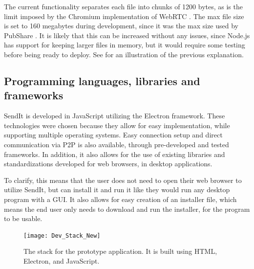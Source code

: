     The current functionality separates each file into chunks of 1200 bytes, as is the limit imposed by the Chromium implementation of WebRTC \cite{SctptransportCcCode}. The max file size is set to 160 megabytes during development, since it was the max size used by PubShare \cite{url_pubshare}. It is likely that this can be increased without any issues, since Node.js has support for keeping larger files in memory, but it would require some testing before being ready to deploy. See  for an illustration of the previous explanation.

  \subsection{Programming languages, libraries and frameworks}
    SendIt is developed in JavaScript utilizing the Electron framework. These technologies were chosen because they allow for easy implementation, while supporting multiple operating systems. Easy connection setup and direct communication via P2P is also available, through pre-developed and tested frameworks. In addition, it also allows for the use of existing libraries and standardizations developed for web browsers, in desktop applications. 

    To clarify, this means that the user does not need to open their web browser to utilize SendIt, but can install it and run it like they would run any desktop program with a GUI. It also allows for easy creation of an installer file, which means the end user only needs to download and run the installer, for the program to be usable.

    \begin{figure}
    \centering
    \texttt{[image: Dev\_Stack\_New]}
    \caption[Application stack]{The stack for the prototype application. It is built using HTML, Electron, and JavaScript.}
    \label{fig:dev_stack}
    \end{figure}

